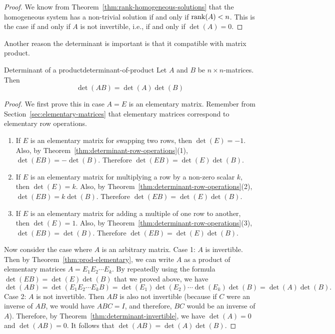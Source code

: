 \begin{proof}
  We know from Theorem~\ref{thm:rank-homogeneous-solutions} that the
  homogeneous system has a non-trivial solution if and only if
  $\rank(A)<n$. This is the case if and only if $A$ is not invertible,
  i.e., if and only if $\det(A)=0$.
\end{proof}

Another reason the determinant is important is that it compatible with
matrix product.

\begin{theorem}{Determinant of a product}{determinant-of-product}
  Let $A$ and $B$ be $n\times n$-matrices. Then%
  \begin{equation*}
    \det(AB) =\det(A)\det(B)
  \end{equation*}
\end{theorem}

\begin{proof}
  We first prove this in case $A=E$ is an elementary matrix. Remember
  from Section~\ref{sec:elementary-matrices} that elementary matrices
  correspond to elementary row operations.
  \begin{enumerate}
  \item If $E$ is an elementary matrix for swapping two rows, then
    $\det(E)=-1$. Also, by Theorem~\ref{thm:determinant-row-operations}(1),
    $\det(EB)=-\det(B)$. Therefore $\det(EB)=\det(E)\det(B)$.
  \item If $E$ is an elementary matrix for multiplying a row by a
    non-zero scalar $k$, then $\det(E)=k$. Also, by
    Theorem~\ref{thm:determinant-row-operations}(2),
    $\det(EB)=k\det(B)$. Therefore $\det(EB)=\det(E)\det(B)$.
  \item If $E$ is an elementary matrix for adding a multiple of one
    row to another, then $\det(E)=1$. Also, by
    Theorem~\ref{thm:determinant-row-operations}(3),
    $\det(EB)=\det(B)$. Therefore $\det(EB)=\det(E)\det(B)$.
  \end{enumerate}
  Now consider the case where $A$ is an arbitrary matrix. Case 1: $A$
  is invertible. Then by Theorem~\ref{thm:prod-elementary}, we can
  write $A$ as a product of elementary matrices $A=E_1E_2\cdots E_k$.
  By repeatedly using the formula $\det(EB)=\det(E)\det(B)$ that we
  proved above, we have
  \begin{equation*}
    \det(AB) = \det(E_1E_2\cdots E_kB) = \det(E_1)\det(E_2)\cdots\det(E_k)\det(B)
    = \det(A)\det(B).
  \end{equation*}
  Case 2: $A$ is not invertible. Then $AB$ is also not invertible
  (because if $C$ were an inverse of $AB$, we would have $ABC=I$, and
  therefore, $BC$ would be an inverse of $A$). Therefore, by
  Theorem~\ref{thm:determinant-invertible}, we have $\det(A)=0$ and
  $\det(AB)=0$. It follows that $\det(AB)=\det(A)\det(B)$.
\end{proof}

